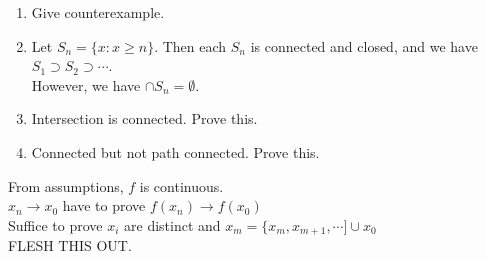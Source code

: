 \documentclass[12pt]{article}
\newenvironment{problem}[2][Problem]{\begin{trivlist}
\item[\hskip \labelsep {\bfseries #1}\hskip \labelsep {\bfseries #2.}]}{\end{trivlist}}
\begin{document}
\begin{problem}{76 on p. 131}
\end{problem}

\begin{enumerate}[label=(\alph*)]
	\item Give counterexample.
	
	\item Let $S_n = \{x: x \geq n\}$. Then each $S_n$ is connected and closed, and we have $S_1 \supset S_2 \supset \cdots$.\\
	
	However, we have $\cap S_n = \emptyset$.
	
	\item Intersection is connected. Prove this.
	
	\item Connected but not path connected. Prove this.
	
\end{enumerate}

\begin{problem}{1 on p. 147}
\end{problem}

From assumptions, $f$ is continuous.\\

$x_n \to x_0$ have to prove $f(x_n) \to f(x_0)$\\

Suffice to prove $x_i$ are distinct and $x_m = \{x_m, x_{m+1}, \cdots] \cup x_0$\\

FLESH THIS OUT.
\end{document}
